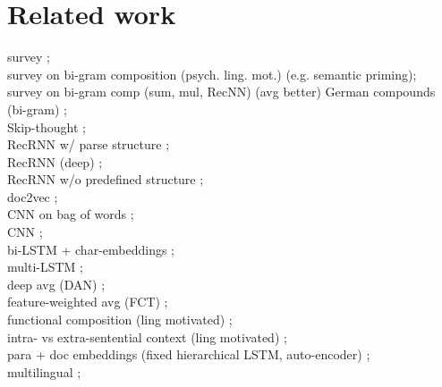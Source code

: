 \section{Related work}

survey \autocite{wang_comparison_2017}; \\
survey on bi-gram composition (psych. ling. mot.) \autocite{mitchell_composition_2010} (e.g. semantic priming); \\
survey on bi-gram comp (sum, mul, RecNN) \autocite{blacoe_comparison_2012} (avg better)
German compounds (bi-gram) \autocite{dima_reverse-engineering_2015}; \\
Skip-thought \autocite{kiros_skip-thought_2015}; \\
RecRNN w/ parse structure \autocite{socher_dynamic_2011,socher_semantic_2012,socher_recursive_2013,tai_improved_2015,wieting_paraphrase_2015}; \\ 
RecRNN (deep) \autocite{irsoy_deep_2014}; \\ 
RecRNN w/o predefined structure \autocite{zhao_self-adaptive_2015,chen_sentence_2015}; \\
doc2vec \autocite{le_distributed_2014,lau_empirical_2016}; \\ 
CNN on bag of words \autocite{kalchbrenner_convolutional_2014}; \\
CNN \autocite{kim_convolutional_2014,hu_convolutional_2014,yin_convolutional_2015,he_multi-perspective_2015}; \\
bi-LSTM + char-embeddings \autocite{ling_finding_2015}; \\
multi-LSTM \autocite{liu_multi-timescale_2015}; \\
deep avg (DAN) \autocite{iyyer_deep_2015}; \\
feature-weighted avg (FCT) \autocite{yu_learning_2015}; \\
functional composition (ling motivated) \autocite{baroni_frege_2014,paperno_practical_2014}; \\
intra- vs extra-sentential context (ling motivated) \autocite{polajnar_exploration_2015}; \\
para + doc embeddings (fixed hierarchical LSTM, auto-encoder)
\autocite{li_hierarchical_2015}; \\  
multilingual \autocite{hermann_multilingual_2014}; \\

